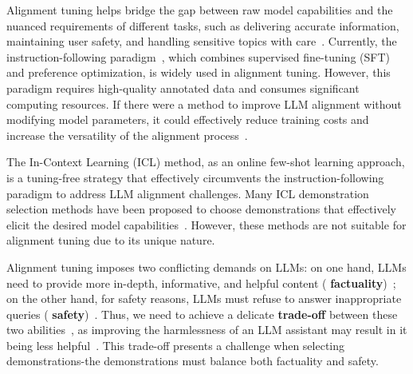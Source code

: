 Alignment tuning helps bridge the gap between raw model capabilities and the nuanced requirements of different tasks, such as delivering accurate information, maintaining user safety, and handling sensitive topics with care~\citep{shneiderman2020bridging,shen2023large,wang2023aligning,DBLP:conf/iclr/Qi0XC0M024}. 
%
Currently, the instruction-following paradigm~\citep{ouyang2022training,sun2023aligning,DBLP:conf/iclr/DaiPSJXL0024,rafailov2024direct,zhou2024lima,wu2024self}, which combines supervised fine-tuning (SFT) and preference optimization, is widely used in alignment tuning. 
However, this paradigm requires high-quality annotated data and consumes significant computing resources. 
If there were a method to improve LLM alignment without modifying model parameters, it could effectively reduce training costs and increase the versatility of the alignment process~\citep{brown2020language}. 


The In-Context Learning (ICL) method, as an online few-shot learning approach, is a tuning-free strategy that effectively circumvents the instruction-following paradigm to address LLM alignment challenges.
Many ICL demonstration selection methods have been proposed to choose demonstrations that effectively elicit the desired model capabilities~\citep{liu2022makes,min2022rethinking,DBLP:conf/icml/Ye0F0K23,DBLP:journals/corr/abs-2305-14128,peng2024revisiting,DBLP:conf/icml/ChoiL24,DBLP:conf/eacl/WangYW24}.
However, these methods are not suitable for alignment tuning due to its unique nature. 

Alignment tuning imposes two conflicting demands on LLMs: on one hand, LLMs need to provide more in-depth, informative, and helpful content (\textbf{\color{myblue} factuality})~\citep{shen2023large}; on the other hand, for safety reasons, LLMs must refuse to answer inappropriate queries (\textbf{\color{myred} safety})~\citep{ji2024beavertails}. 
Thus, we need to achieve a delicate \textbf{trade-off} between these two abilities~\citep{DBLP:journals/corr/abs-2404-09932}, as improving the harmlessness of an LLM assistant may result in it being less helpful~\citep{DBLP:journals/corr/abs-2204-05862}.
This trade-off presents a challenge when selecting demonstrations-the demonstrations must balance both factuality and safety.


